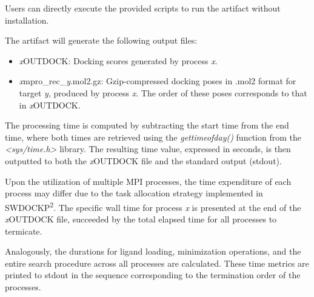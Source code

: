 \documentclass[nonacm,sigconf]{acmart}
\begin{document}
\artcomp
Users can directly execute the provided scripts to run the artifact without installation.

\artout
The artifact will generate the following output files:
\begin{itemize}
    \item \textit{x}OUTDOCK: Docking scores generated by process \textit{x}.
    \item \textit{x}mpro\_rec\_\textit{y}.mol2.gz: Gzip-compressed docking poses in .mol2 format for target \textit{y}, produced by process \textit{x}. The order of these poses corresponds to that in \textit{x}OUTDOCK.
\end{itemize}
The processing time is computed by subtracting the start time from the end time, where both times are retrieved using the \textit{gettimeofday()} function from the \textit{<sys/time.h>} library. The resulting time value, expressed in seconds, is then outputted to both the \textit{x}OUTDOCK file and the standard output (stdout).

Upon the utilization of multiple MPI processes, the time expenditure of each process may differ due to the task allocation strategy implemented in SWDOCKP\textsuperscript{2}. The specific wall time for process \textit{x} is presented at the end of the \textit{x}OUTDOCK file, succeeded by the total elapsed time for all processes to termicate.

Analogously, the durations for ligand loading, minimization operations, and the entire search procedure across all processes are calculated. These time metrics are printed to stdout in the sequence corresponding to the termination order of the processes.
\end{document}
